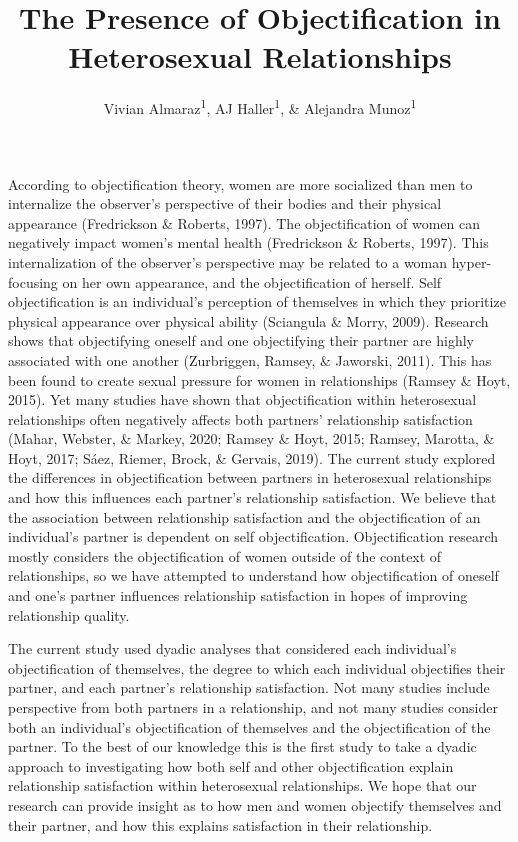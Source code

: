 \documentclass[
  man]{apa6}
\title{The Presence of Objectification in Heterosexual Relationships}
\author{Vivian Almaraz\textsuperscript{1}, AJ Haller\textsuperscript{1}, \& Alejandra Munoz\textsuperscript{1}}
\date{}
\affiliation{\vspace{0.5cm}\textsuperscript{1} Smith College}
\begin{document}
\maketitle

According to objectification theory, women are more socialized than men to internalize the observer's perspective of their bodies and their physical appearance (Fredrickson \& Roberts, 1997). The objectification of women can negatively impact women's mental health (Fredrickson \& Roberts, 1997). This internalization of the observer's perspective may be related to a woman hyper-focusing on her own appearance, and the objectification of herself. Self objectification is an individual's perception of themselves in which they prioritize physical appearance over physical ability (Sciangula \& Morry, 2009). Research shows that objectifying oneself and one objectifying their partner are highly associated with one another (Zurbriggen, Ramsey, \& Jaworski, 2011). This has been found to create sexual pressure for women in relationships (Ramsey \& Hoyt, 2015). Yet many studies have shown that objectification within heterosexual relationships often negatively affects both partners' relationship satisfaction (Mahar, Webster, \& Markey, 2020; Ramsey \& Hoyt, 2015; Ramsey, Marotta, \& Hoyt, 2017; Sáez, Riemer, Brock, \& Gervais, 2019). The current study explored the differences in objectification between partners in heterosexual relationships and how this influences each partner's relationship satisfaction. We believe that the association between relationship satisfaction and the objectification of an individual's partner is dependent on self objectification. Objectification research mostly considers the objectification of women outside of the context of relationships, so we have attempted to understand how objectification of oneself and one's partner influences relationship satisfaction in hopes of improving relationship quality.

The current study used dyadic analyses that considered each individual's objectification of themselves, the degree to which each individual objectifies their partner, and each partner's relationship satisfaction. Not many studies include perspective from both partners in a relationship, and not many studies consider both an individual's objectification of themselves and the objectification of the partner. To the best of our knowledge this is the first study to take a dyadic approach to investigating how both self and other objectification explain relationship satisfaction within heterosexual relationships. We hope that our research can provide insight as to how men and women objectify themselves and their partner, and how this explains satisfaction in their relationship.
\end{document}

